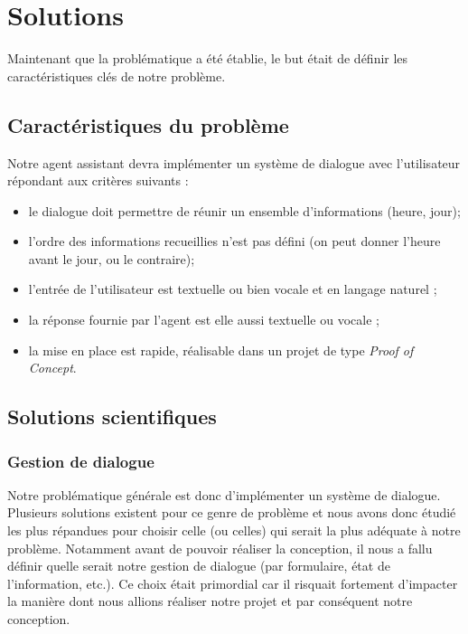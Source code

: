 \chapter{Solutions}

Maintenant que la problématique a été établie, le but était de définir les caractéristiques clés de notre problème.


\section{Caractéristiques du problème}
Notre agent assistant devra implémenter un système de dialogue avec l'utilisateur répondant aux critères suivants :
\begin{itemize}
	\item le dialogue doit permettre de réunir un ensemble d'informations (heure, jour);
 	\item l'ordre des informations recueillies n'est pas défini (on peut donner l'heure avant le jour, ou le contraire);
 	\item l'entrée de l'utilisateur est textuelle ou bien vocale et en langage naturel ;
 	\item la réponse fournie par l'agent est elle aussi textuelle ou vocale ;
 	\item la mise en place est rapide, réalisable dans un projet de type \textit{Proof of Concept}.
\end{itemize}

\section{Solutions scientifiques}

\subsection{Gestion de dialogue}
Notre problématique générale est donc d'implémenter un système de dialogue. Plusieurs solutions existent pour ce genre de problème et nous avons donc étudié les plus répandues pour choisir celle (ou celles) qui serait la plus adéquate à notre problème. Notamment avant de pouvoir réaliser la conception, il nous a fallu définir quelle serait notre gestion de dialogue (par formulaire, état de l'information, etc.). Ce choix était primordial car il risquait fortement d'impacter la manière dont nous allions réaliser notre projet et par conséquent notre conception.


\FloatBarrier

